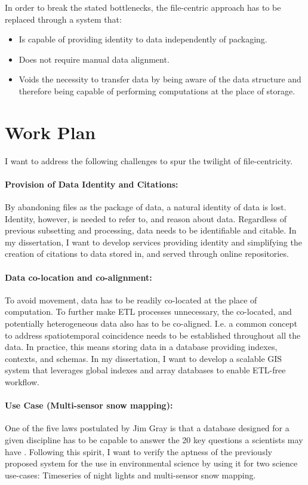 \documentclass[letterpaper, parskip=half]{scrartcl}
\begin{document}
In order to break the stated bottlenecks, the file-centric approach has to be replaced through a system that:
\begin{itemize}
    \item Is capable of providing identity to data independently of packaging.
    \item Does not require manual data alignment.
    \item Voids the necessity to transfer data by being aware of the data structure and therefore being capable of performing computations at the place of storage.
\end{itemize}


\newpage

\section{Work Plan}
I want to address the following challenges to spur the twilight of file-centricity.

\paragraph{Provision of Data Identity and Citations:}
By abandoning files as the package of data, a natural identity of data is lost. Identity, however, is needed to refer to, and reason about data. Regardless of previous subsetting and processing, data needs to be identifiable and citable. In my dissertation, I want to develop services providing identity and simplifying the creation of citations to data stored in, and served through online repositories.

\paragraph{Data co-location and co-alignment:}
To avoid movement, data has to be readily co-located at the place of computation. To further make \gls{ETL} processes unnecessary, the co-located, and potentially heterogeneous data also has to be co-aligned. I.e. a common concept to address spatiotemporal coincidence needs to be established throughout all the data. In practice, this means storing data in a database providing indexes, contexts, and schemas. 
In my dissertation, I want to develop a scalable \gls{GIS} system that leverages global indexes and array databases to enable \gls{ETL}-free workflow.

\paragraph{Use Case (Multi-sensor snow mapping):}
One of the five laws postulated by Jim Gray is that a database designed for a given discipline has to be capable to answer the 20 key questions a scientists may have \citep{Hey2009, Szalay2009}.
Following this spirit, I want to verify the aptness of the previously proposed system for the use in environmental science by using it for two science use-cases: Timeseries of night lights and multi-sensor snow mapping. 
\end{document}
